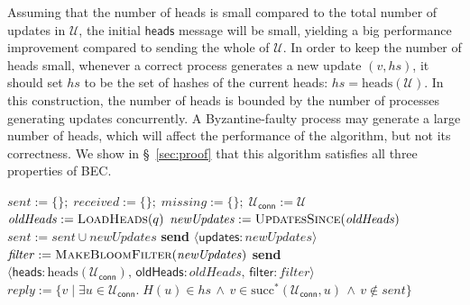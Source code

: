 \documentclass[a4paper,anonymous,USenglish]{lipics-v2019}
\begin{document}
Assuming that the number of heads is small compared to the total number of updates in $\mathcal{U}$, the initial $\mathsf{heads}$ message will be small, yielding a big performance improvement compared to sending the whole of $\mathcal{U}$.
In order to keep the number of heads small, whenever a correct process generates a new update $(v, \mathit{hs})$, it should set $\mathit{hs}$ to be the set of hashes of the current heads:
$\mathit{hs} = \mathrm{heads}(\mathcal{U})$.
In this construction, the number of heads is bounded by the number of processes generating updates concurrently.
A Byzantine-faulty process may generate a large number of heads, which will affect the performance of the algorithm, but not its correctness.
We show in \S~\ref{sec:proof} that this algorithm satisfies all three properties of BEC.

\begin{algorithm}[t]
    \begin{algorithmic}[1]
        \State $\mathit{sent} := \{\};\; \mathit{received} := \{\};\; \mathit{missing} := \{\};\; \mathcal{U}_\mathsf{conn} := \mathcal{U}$ 
        \State $\mathit{oldHeads} := \Call{LoadHeads}{q}$\label{line:load-heads}
        \State $\mathit{newUpdates} := \Call{UpdatesSince}{\mathit{oldHeads}}$
        \label{line:immediate-send}
            \State $\mathit{sent} := \mathit{sent} \cup \mathit{newUpdates}$
            \State \textbf{send} $\langle\mathsf{updates}: \mathit{newUpdates}\rangle$
        \EndIf\label{line:immediate-send-end}
        \State $\mathit{filter} := \Call{MakeBloomFilter}{\mathit{newUpdates}}$\label{line:make-bloom}
        \State \textbf{send} $\langle\mathsf{heads}: \mathrm{heads}(\mathcal{U}_\mathsf{conn}),\, \mathsf{oldHeads}: \mathit{oldHeads},\, \mathsf{filter}: \mathit{filter}\rangle$ \label{line:a2-send-heads}
    \EndOn
    \State
    \label{line:a2-recv-heads}
        \State $\mathit{reply} := \{v \mid \exists u \in \mathcal{U}_\mathsf{conn}.\; H(u) \in \mathit{hs} \,\wedge\, v \in \mathrm{succ}^*(\mathcal{U}_\mathsf{conn}, u) \,\wedge\, v \notin \mathit{sent}\}$ \label{line:a2-succ}

\end{algorithmic}
\end{algorithm}
\end{document}
